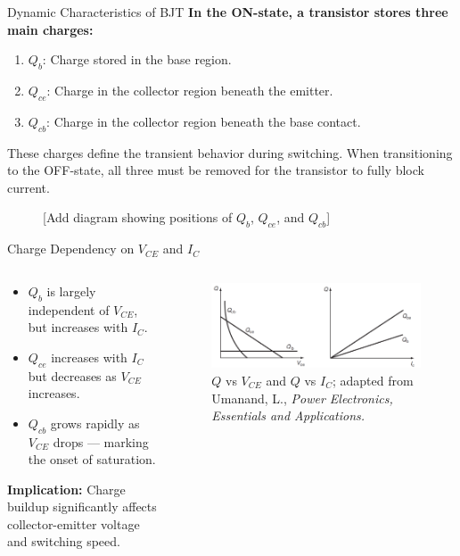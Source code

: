 \begin{frame}{Dynamic Characteristics of BJT}
\textbf{In the ON-state, a transistor stores three main charges:}
\begin{enumerate}
    \item \textbf{$Q_b$}: Charge stored in the base region.
    \item \textbf{$Q_{ce}$}: Charge in the collector region beneath the emitter.
    \item \textbf{$Q_{cb}$}: Charge in the collector region beneath the base contact.
\end{enumerate}

\vspace{1em}
These charges define the transient behavior during switching. When transitioning to the OFF-state, all three must be removed for the transistor to fully block current.

\begin{figure}
    \centering
    \caption{[Add diagram showing positions of $Q_b$, $Q_{ce}$, and $Q_{cb}$]}
\end{figure}
\end{frame}


\begin{frame}{Charge Dependency on $V_{CE}$ and $I_C$}
        \begin{columns}
    \begin{column}{0.5\textwidth}
\begin{itemize}
    \item \textbf{$Q_b$} is largely independent of $V_{CE}$, but increases with $I_C$.
    \item \textbf{$Q_{ce}$} increases with $I_C$ but decreases as $V_{CE}$ increases.
    \item \textbf{$Q_{cb}$} grows rapidly as $V_{CE}$ drops — marking the onset of saturation.
\end{itemize}

\textbf{Implication:} Charge buildup significantly affects collector-emitter voltage and switching speed.
    \end{column}

    \begin{column}{0.5\textwidth}
\begin{figure}
    \centering
    \includegraphics[width=1\linewidth]{fig/lec04/BJT_charge_dependancy.png}
    \caption{$Q$ vs $V_{CE}$ and $Q$ vs $I_C$; adapted from Umanand, L., \textit{Power Electronics, Essentials and Applications.}}
\end{figure}
    \end{column}
\end{columns}
\end{frame}


